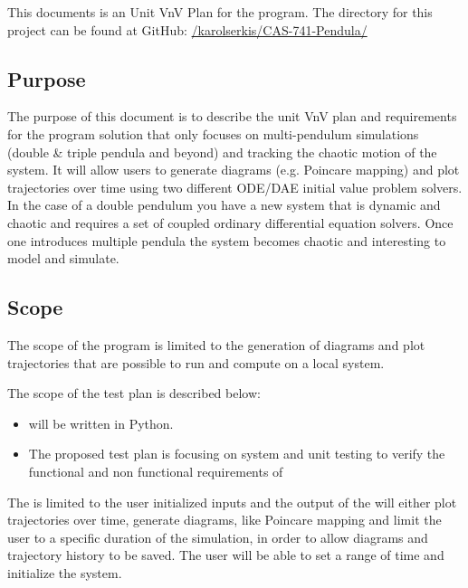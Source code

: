 \documentclass[12pt, titlepage]{article}
\begin{document}
This documents is an Unit VnV Plan for the \progname program. The
directory for this project can be found at GitHub:
\href{https://github.com/karolserkis/CAS-741-Pendula/}{/karolserkis/CAS-741-Pendula/}\\

\subsection{Purpose}

The purpose of this document is to describe the unit VnV plan and requirements for the
\progname program solution that
only focuses on multi-pendulum simulations (double \& triple pendula and beyond) and tracking the chaotic
motion of the system. It will allow users to generate diagrams (e.g. Poincare
mapping)
and plot trajectories over time using two different ODE/DAE initial value
problem solvers. In the case of
a double pendulum you have a new system that is dynamic and chaotic and
requires a set of coupled ordinary differential equation solvers. Once one
introduces
multiple
pendula the system becomes chaotic and interesting to model and simulate. 

\subsection{Scope}

The scope of the \progname program is limited to the generation 
of diagrams and plot trajectories that are possible to run and compute on a
local system.

The scope of the test plan is described below:
\begin{itemize}
\item \progname{} will be written in Python.
\item The proposed test plan is focusing on system and unit testing to
  verify the functional and non functional requirements of
  \progname{}
\end{itemize}

The \progname is limited to the user
initialized inputs and the output of the \progname will either plot trajectories over time, generate
diagrams, like Poincare mapping
and limit the user to a specific duration of the simulation, in order to allow
diagrams and trajectory history to be saved.
The user will be able to set a range of time and initialize the system. \\
\end{document}
